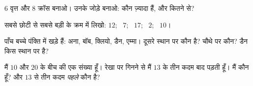 \begin{exercise}[$\star$]\label{exo:g1:counting:6}
$6$ वृत्त और $8$ क्रॉस बनाओ। उनके जोड़े बनाओ: कौन ज़्यादा हैं, और
कितने से?
\end{exercise}

\begin{exercise}[$\star$]\label{exo:g1:counting:7}
सबसे छोटी से सबसे बड़ी के क्रम में लिखो: $12$; \ $7$; \ $17$; \ $2$; \ $10$।
\end{exercise}

\begin{exercise}[$\star$]\label{exo:g1:counting:8}
पाँच बच्चे पंक्ति में खड़े हैं: अना, बॉब, क्लियो, डैन, एम्मा। दूसरे
स्थान पर कौन है? चौथे पर कौन? डैन किस स्थान पर है?
\end{exercise}

\begin{exercise}[$\star\star$]\label{exo:g1:counting:9}
मैं $10$ और $20$ के बीच की एक संख्या हूँ। रेखा पर गिनने से मैं
$13$ के तीन कदम बाद पड़ती हूँ। मैं कौन हूँ? और $13$ से तीन कदम
\emph{पहले} कौन है?
\end{exercise}
